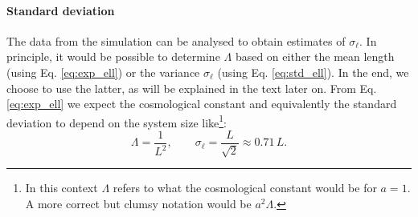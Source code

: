 \paragraph{Standard deviation}
The data from the simulation can be analysed to obtain estimates of $\sigma_\ell$. In principle, it would be possible to determine $\Lambda$ based on either the mean length (using Eq. \eqref{eq:exp_ell}) or the variance $\sigma_\ell$ (using Eq. \eqref{eq:std_ell}). In the end, we choose to use the latter, as will be explained in the text later on.
From Eq. \eqref{eq:exp_ell} we expect the cosmological constant and equivalently the standard deviation to depend on the system size like\footnote{In this context $\Lambda$ refers to what the cosmological constant would be for $a = 1$. A more correct but clumsy notation would be $a^2 \Lambda$.}:
\begin{equation}\label{eq:std_theory}
    \Lambda = \frac{1}{L^2}, \qquad \sigma_\ell = \frac{L}{\sqrt{2}} \approx 0.71 \, L.
\end{equation}

